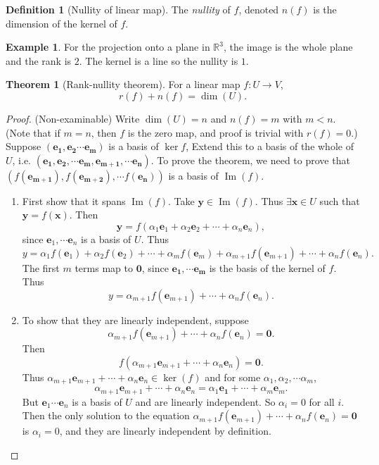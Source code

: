 \documentclass[a4paper]{article}
\theoremstyle{definition}
\newtheorem*{thm}{Theorem}
\newtheorem*{defi}{Definition}
\newtheorem*{eg}{Example}
\newcommand{\mb}[1]{\mathbf{#1}}
\newcommand{\R}{\mathbb{R}}
\DeclareMathOperator\im{Im}
\begin{document}
\begin{defi}[Nullity of linear map]
  The \emph{nullity} of $f$, denoted $n(f)$ is the dimension of the kernel of $f$.
\end{defi}

\begin{eg}
  For the projection onto a plane in $\R^3$, the image is the whole plane and the rank is $2$. The kernel is a line so the nullity is $1$.
\end{eg}

\begin{thm}[Rank-nullity theorem]
  For a linear map $f: U \to V$,
  \[
  r(f) + n(f) = \dim (U).
  \]
\end{thm}

\begin{proof}
  (Non-examinable) Write $\dim(U) = n$ and $n(f) = m$ with $m < n$. (Note that if $m = n$, then $f$ is the zero map, and proof is trivial with $r(f) = 0$.) Suppose $(\mb{e_1, e_2\cdots e_m})$ is a basis of $\ker f$, Extend this to a basis of the whole of $U$, i.e. $(\mb{e_1, e_2, \cdots e_m, e_{m+1}, \cdots e_n})$. To prove the theorem, we need to prove that $(f(\mb{e_{m+1}}), f(\mb{e_{m + 2}}), \cdots f({\mb{e_n}}))$ is a basis of $\im (f)$.
    \begin{enumerate}
      \item First show that it spans $\im (f)$. Take $\mb{y}\in \im(f)$. Thus $\exists \mb{x}\in U$ such that $\mb{y} = f(\mb{x})$. Then
        \[
        \mb{y} = f(\alpha_1\mb{e}_1 + \alpha_2\mb{e}_2 + \cdots + \alpha_n \mb{e}_n),
        \]
        since $\mb{e}_1, \cdots \mb{e}_n$ is a basis of $U$. Thus
        \[
        y = \alpha_1f(\mb{e}_1) + \alpha_2f(\mb{e}_2) + \cdots + \alpha_m f(\mb{e}_m) + \alpha_{m + 1}f(\mb{e}_{m + 1}) + \cdots + \alpha_nf(\mb{e}_n).
        \]
        The first $m$ terms map to $\mb{0}$, since $\mb{e_1, \cdots e_m}$ is the basis of the kernel of $f$. Thus
        \[
        y = \alpha_{m + 1} f(\mb{e}_{m + 1}) + \cdots + \alpha_n f(\mb{e}_n).
        \]
      \item To show that they are linearly independent, suppose
        \[
        \alpha_{m + 1} f(\mb{e}_{m + 1}) + \cdots + \alpha_n f(\mb{e}_n) = \mb{0}.
        \]
        Then 
        \[
        f(\alpha_{m + 1}\mb{e}_{m + 1} + \cdots + \alpha_n\mb{e}_n) = \mb{0}.
        \]
        Thus $\alpha_{m + 1}\mb{e}_{m + 1} + \cdots + \alpha_n\mb{e}_n\in \ker (f)$ and for some $\alpha_1, \alpha_2, \cdots \alpha_m$, 
        \[
        \alpha_{m + 1}\mb{e}_{m + 1} + \cdots + \alpha_n\mb{e}_n = \alpha_1\mb{e_1} + \cdots + \alpha_m\mb{e}_m.
        \]
        But $\mb{e}_1\cdots \mb{e}_n$ is a basis of $U$ and are linearly independent. So $\alpha_i = 0$ for all $i$. Then the only solution to the equation $\alpha_{m + 1} f(\mb{e}_{m + 1}) + \cdots + \alpha_n f(\mb{e}_n) = \mb{0}$ is $\alpha_i = 0$, and they are linearly independent by definition.
    \end{enumerate}
\end{proof}
\end{document}

